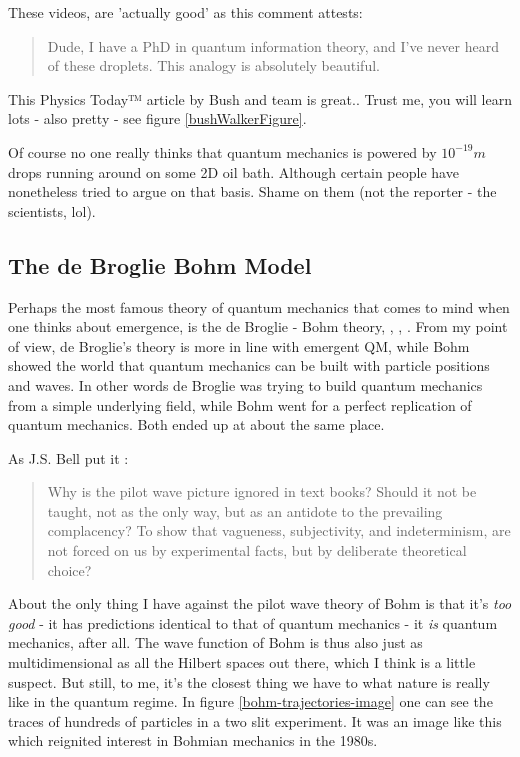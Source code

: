\documentclass[../rzero]{subfiles}
\begin{document}
These videos, are 'actually good'\cite{theonionYouTubeContestChallenges2008} as this comment attests:
\begin{quotation}
	Dude, I have a PhD in quantum information theory, and I've never heard of these droplets. This analogy is absolutely beautiful. 
\end{quotation}
 
This Physics Today™ article by Bush and team is great.\cite{Bush2015a}. Trust me, you will learn lots - also pretty - see figure \ref{bushWalkerFigure}.


Of course no one really thinks that quantum mechanics is powered by $10^{-19}m$ drops running around on some 2D oil bath. Although certain people have nonetheless tried to argue on that basis. Shame on them (not the reporter - the scientists, lol).\cite{wolchoverFamousExperimentDooms2018}


\subsection{The de Broglie Bohm Model}
Perhaps the most famous theory of quantum mechanics that comes to mind when one thinks about emergence, is the de Broglie - Bohm theory\cite{Bohm1952},  \cite{broglieMecaniqueOndulatoireStructure1927}, \cite{Tumulka2017}, \cite{Bohm1982}. From my point of view, de Broglie's theory is more in line with emergent QM, while Bohm showed the world that quantum mechanics can be built with particle positions and waves. In other words de Broglie was trying to build quantum mechanics from a simple underlying field, while Bohm went for a perfect replication of quantum mechanics. Both ended up at about the same place.

As J.S. Bell put it \cite{Bell1982}:
\begin{quotation}
Why is the pilot wave picture ignored in text books? Should it not be taught, not as the only way, but as an antidote to the prevailing complacency? To show that vagueness, subjectivity, and indeterminism, are not forced on us by experimental facts, but by deliberate theoretical choice?
\end{quotation}

About the only thing I have against the pilot wave theory of Bohm is that it's \textit{too good} - it has predictions identical to that of quantum mechanics - it \textit{is} quantum mechanics, after all. The wave function of Bohm is thus also just as multidimensional as all the Hilbert spaces out there, which I think is a little suspect. But still, to me, it's the closest thing we have to what nature is really like in the quantum regime. In figure \ref{bohm-trajectories-image} one can see the traces of hundreds of particles in a two slit experiment. It was an image like this which reignited interest in Bohmian mechanics in the 1980s.  
\end{document}
